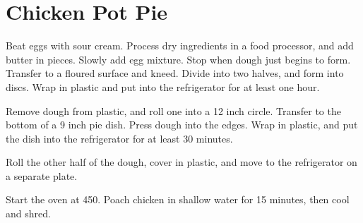 \section{Chicken Pot Pie}
\begin{recipe}



Beat eggs with sour cream. Process dry ingredients in a food processor, and
add butter in pieces. Slowly add egg mixture. Stop when dough just begins to
form. Transfer to a floured surface and kneed. Divide into two halves, and form
into discs. Wrap in plastic and put into the refrigerator for at least one hour.

Remove dough from plastic, and roll one into a 12 inch circle. Transfer to the 
bottom of a 9 inch pie dish. Press dough into the edges. Wrap in plastic, and put
the dish into the refrigerator for at least 30 minutes. 

Roll the other half of the dough, cover in plastic, and move to the refrigerator
on a separate plate. 


Start the oven at 450\degree. Poach chicken in shallow water for 15 minutes, 
then cool and shred. 


\end{recipe}
